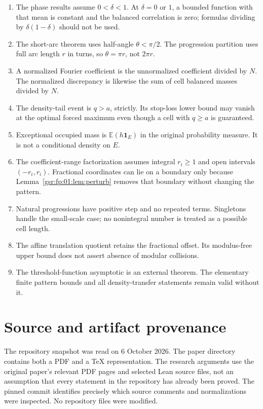 \documentclass[11pt,letterpaper]{article}
\numberwithin{equation}{section}
\theoremstyle{definition}
\theoremstyle{remark}
\newcommand{\E}{\mathbb E}
\newcommand{\one}{\mathbf 1}
\newcommand{\1}{\mathbf 1}
\newcommand{\srctag}[1]{\texorpdfstring{\enspace\textup{[#1]}}{ [#1]}}
\newcommand{\srcnote}[2]{\par\noindent{\small\textit{Source #1, delivered #2.}}\par}
\begin{document}
\begin{enumerate}[leftmargin=2em,itemsep=0.35em]
\item The phase results assume $0<\delta<1$. At $\delta=0$ or $1$, a
bounded function with that mean is constant and the balanced correlation
is zero; formulas dividing by $\delta(1-\delta)$ should not be used.
\item The short-arc theorem uses half-angle $\theta<\pi/2$. The
progression partition uses full arc length $r$ in turns, so
$\theta=\pi r$, not $2\pi r$.
\item A normalized Fourier coefficient is the unnormalized coefficient
divided by $N$. The normalized discrepancy is likewise the sum of cell
balanced masses divided by $N$.
\item The density-tail event is $q>a$, strictly. Its stop-loss lower bound
may vanish at the optimal forced maximum even though a cell with
$q\ge a$ is guaranteed.
\item Exceptional occupied mass is $\E(h\one_E)$ in the original
probability measure. It is not a conditional density on $E$.
\item The coefficient-range factorization assumes integral $r_i\ge1$
and open intervals $(-r_i,r_i)$. Fractional coordinates can lie on a
boundary only because Lemma~\ref{gsr:fp:01:lem:perturb} removes that boundary
without changing the pattern.
\item Natural progressions have positive step and no repeated terms.
Singletons handle the small-scale case; no nonintegral number is treated
as a possible cell length.
\item The affine translation quotient retains the fractional offset.
Its modulus-free upper bound does not assert absence of modular collisions.
\item The threshold-function asymptotic is an external theorem.
The elementary finite pattern bounds and all density-transfer statements
remain valid without it.
\end{enumerate}

\section[{Source and artifact provenance\srctag{01}}]{Source and artifact provenance}\label{gsr:fz:01:sec:dB}\label{gsr:fz:01:app:provenance}
\srcnote{01}{Appendix B}

The repository snapshot was read on 6 October 2026. The paper directory
contains both a PDF and a TeX representation. The research arguments use
the original paper's relevant PDF pages and selected Lean source files,
not an assumption that every statement in the repository has already been
proved. The pinned commit identifies precisely which source comments and
normalizations were inspected. No repository files were modified.
\end{document}
